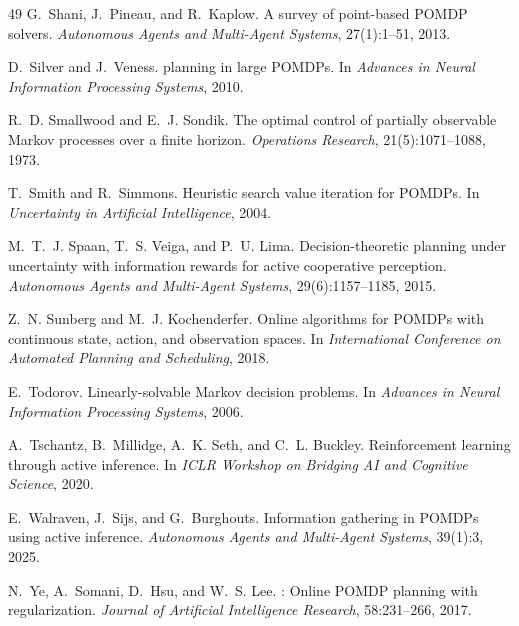\documentclass[runningheads]{llncs}
\begin{document}
\begin{thebibliography}{49}
G.~Shani, J.~Pineau, and R.~Kaplow.
\newblock A survey of point-based {POMDP} solvers.
\newblock \emph{Autonomous Agents and Multi-Agent Systems}, 27(1):1--51, 2013.

D.~Silver and J.~Veness.
 planning in large {POMDP}s.
\newblock In \emph{Advances in Neural Information Processing Systems}, 2010.

R.~D. Smallwood and E.~J. Sondik.
\newblock The optimal control of partially observable {M}arkov processes over a finite horizon.
\newblock \emph{Operations Research}, 21(5):1071--1088, 1973.

T.~Smith and R.~Simmons.
\newblock Heuristic search value iteration for {POMDP}s.
\newblock In \emph{Uncertainty in Artificial Intelligence}, 2004.

M.~T.~J. Spaan, T.~S. Veiga, and P.~U. Lima.
\newblock Decision-theoretic planning under uncertainty with information rewards for active cooperative perception.
\newblock \emph{Autonomous Agents and Multi-Agent Systems}, 29(6):1157--1185, 2015.

Z.~N. Sunberg and M.~J. Kochenderfer.
\newblock Online algorithms for {POMDP}s with continuous state, action, and observation spaces.
\newblock In \emph{International Conference on Automated Planning and Scheduling}, 2018.

E.~Todorov.
\newblock Linearly-solvable {M}arkov decision problems.
\newblock In \emph{Advances in Neural Information Processing Systems}, 2006.

A.~Tschantz, B.~Millidge, A.~K. Seth, and C.~L. Buckley.
\newblock Reinforcement learning through active inference.
\newblock In \emph{ICLR Workshop on Bridging AI and Cognitive Science}, 2020.

E.~Walraven, J.~Sijs, and G.~Burghouts.
\newblock Information gathering in {POMDP}s using active inference.
\newblock \emph{Autonomous Agents and Multi-Agent Systems}, 39(1):3, 2025.

N.~Ye, A.~Somani, D.~Hsu, and W.~S. Lee.
: Online {POMDP} planning with regularization.
\newblock \emph{Journal of Artificial Intelligence Research}, 58:231--266, 2017.

\end{thebibliography}
\end{document}
